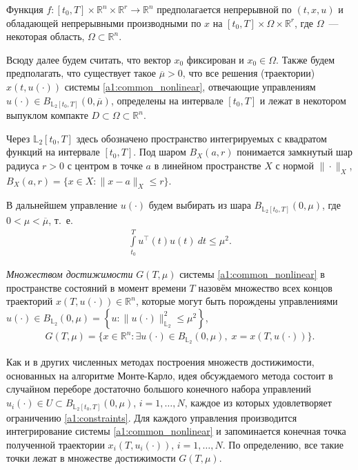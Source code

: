 \documentclass[../main.tex]{subfiles}
\begin{document}
Функция $ f: [t_0, {T}] \times \mathbb{R}^n \times \mathbb{R}^r \rightarrow \mathbb{R}^{n} $ предполагается непрерывной по $(t,x,u)$ и обладающей непрерывными производными по $ x $ на $ [t_0, {T}] \times \Omega \times \mathbb{R}^r $, где $\Omega$~--- некоторая область, $\Omega \subset \mathbb{R}^n$.

Всюду далее будем считать, что вектор $x_0$ фиксирован и $x_0 \in \Omega $.
Также будем предполагать, что существует такое $\overline{\mu} > 0 $, что все решения (траектории) $ x(t, u(\cdot)) $ системы \eqref{a1:common_nonlinear}, отвечающие управлениям $u(\cdot) \in B_{\mathbb{L}_2[t_0, {T}]}(0,\overline{\mu})$, определены на интервале $ [t_0,{T}] $ и лежат в некотором выпуклом компакте $D \subset \Omega \subset \mathbb{R}^n$. 
 
Через $\mathbb{L}_2[t_0, {T}]$ здесь обозначено пространство интегрируемых с квадратом функций на интервале $[t_0, {T}]$. 
Под шаром $B_X(a,r)$ понимается замкнутый шар радиуса $r>0$ с центром в точке $a$ в линейном пространстве $X$ с нормой $\|\cdot\|_X$, $B_X(a, r) = \{x\in X: \|x-a\|_X \leqslant r \}$.
 
В дальнейшем управление $ u(\cdot) $ будем выбирать из шара $ B_{\mathbb{L}_2[t_0, {T}]}(0,\mu) $, где $ 0 < \mu < \overline{\mu} $, т.~е.
\begin{gather}\label{a1:constraints}
	\int\limits_{t_0}^T u^{\top}(t) u(t) \ dt \leqslant \mu^2.
\end{gather}
 
{\sl Множеством достижимости } $ G(T,\mu) $ системы \eqref{a1:common_nonlinear} в пространстве состояний в момент времени $ T $ назовём множество всех концов траекторий $ x(T, u(\cdot)) \in \mathbb{R}^n $, которые могут быть порождены управлениями $ u(\cdot) \in B_{\mathbb{L}_2}(0,\mu) =\left\lbrace u:\lVert u(\cdot)\rVert^2_{\mathbb{L}_2} \leqslant \mu^2\right\rbrace $,
\begin{gather*}
	G(T,\mu)=\{x\in \mathbb{R}^n:\exists u(\cdot)\in B_{\mathbb{L}_2}(0,\mu),\; x=x(T,u(\cdot))\}.
\end{gather*}
 
Как и в других численных методах построения множеств достижимости, основанных на алгоритме Монте-Карло, идея обсуждаемого метода состоит в случайном переборе достаточно большого конечного набора управлений $u_i(\cdot) \in U \subset B_{\mathbb{L}_2[t_0, {T}]}(0,\mu) $, $ i = 1, \dots, N$, каждое из которых удовлетворяет ограничению \eqref{a1:constraints}.
Для каждого управления производится интегрирование системы \eqref{a1:common_nonlinear} и запоминается конечная точка полученной траектории $x_i(T, u_i(\cdot))$, $ i = 1, \dots, N$. 
По определению, все такие точки лежат в множестве достижимости $G(T,\mu)$.
 
\end{document}
